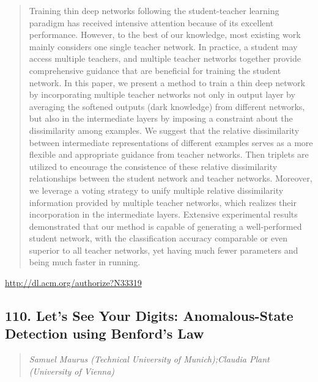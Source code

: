 \documentclass{article}
\begin{document}
\begin{quote}
Training thin deep networks following the student-teacher learning paradigm has received intensive attention because of its excellent performance. However, to the best of our knowledge, most existing work mainly considers one single teacher network. In practice, a student may access multiple teachers, and multiple teacher networks together provide comprehensive guidance that are beneficial for training the student network. In this paper, we present a method to train a thin deep network by incorporating multiple teacher networks not only in output layer by averaging the softened outputs (dark knowledge) from different networks, but also in the intermediate layers by imposing a constraint about the dissimilarity among examples. We suggest that the relative dissimilarity between intermediate representations of different examples serves as a more flexible and appropriate guidance from teacher networks. Then triplets are utilized to encourage the consistence of these relative dissimilarity relationships between the student network and teacher networks. Moreover, we leverage a voting strategy to unify multiple relative dissimilarity information provided by multiple teacher networks, which realizes their incorporation in the intermediate layers. Extensive experimental results demonstrated that our method is capable of generating a well-performed student network, with the classification accuracy comparable or even superior to all teacher networks, yet having much fewer parameters and being much faster in running.
\end{quote}

\href{http://dl.acm.org/authorize?N33319}{http://dl.acm.org/authorize?N33319}

\subsection{110. Let's See Your Digits: Anomalous-State Detection using Benford's Law}

\begin{quote}
\footnotesize{\textit{Samuel Maurus (Technical University of Munich);Claudia Plant (University of Vienna)}}

\end{quote}
\end{document}
